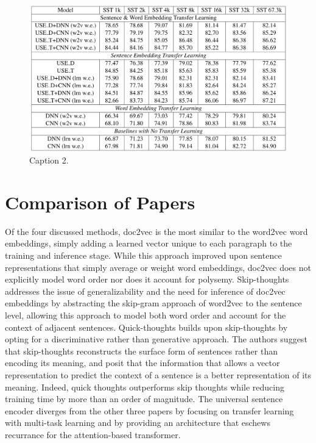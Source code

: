 \begin{figure}[h!]
\centering
  \includegraphics[width=1\linewidth]{files/use-3.png}
  \caption{Caption 2.}
  \label{fig:use-2}
\end{figure}

\newpage

\section{\label{sec:level5} Comparison of Papers}

Of the four discussed methods, doc2vec \cite{conf/icml/LeM14} is the most similar to the word2vec word embeddings, simply adding a learned vector unique to each paragraph to the training and inference stage. While this approach improved upon sentence representations that simply average or weight word embeddings, doc2vec does not explicitly model word order nor does it account for polysemy. Skip-thoughts \cite{DBLP:journals/corr/KirosZSZTUF15} addresses the issue of generalizability and the need for inference of doc2vec embeddings by abstracting the skip-gram approach of word2vec to the sentence level, allowing this approach to model both word order and account for the context of adjacent sentences. Quick-thoughts \cite{logeswaran2018an} builds upon skip-thoughts by opting for a discriminative rather than generative approach. The authors suggest that skip-thoughts reconstructs the surface form of sentences rather than encoding its meaning, and posit that the information that allows a vector representation to predict the context of a sentence is a better representation of its meaning. Indeed, quick thoughts outperforms skip thoughts while reducing training time by more than an order of magnitude. The universal sentence encoder \cite{use} diverges from the other three papers by focusing on transfer learning with multi-task learning and by providing an architecture that eschews recurrance for the attention-based transformer. 

